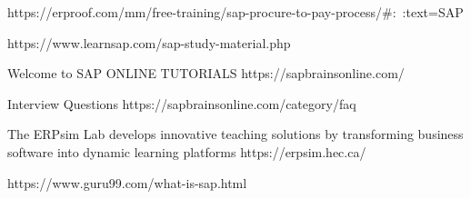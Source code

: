 https://erproof.com/mm/free-training/sap-procure-to-pay-process/#:~:text=SAP%

https://www.learnsap.com/sap-study-material.php

Welcome to SAP ONLINE TUTORIALS
https://sapbrainsonline.com/


Interview Questions https://sapbrainsonline.com/category/faq


The ERPsim Lab develops innovative teaching solutions by transforming business software into dynamic learning platforms
https://erpsim.hec.ca/


https://www.guru99.com/what-is-sap.html